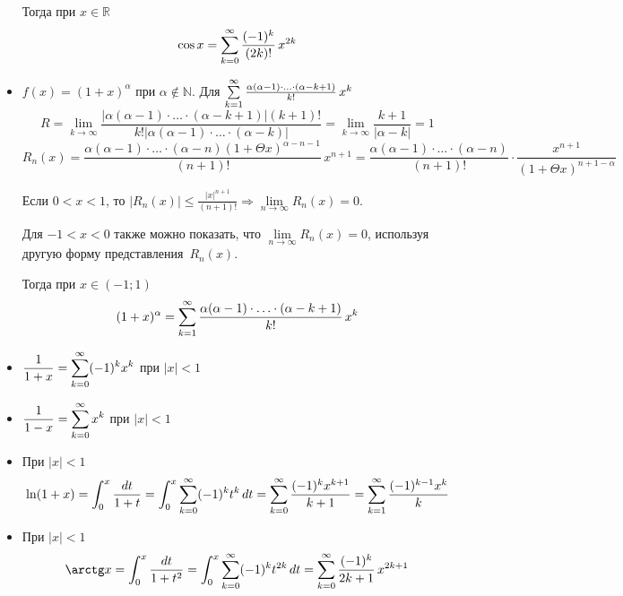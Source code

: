 \begin{itemize}
	Тогда при $x \in \mathbb R$
	\begin{equation*}
	\cos x = \series[0] \frac{(-1)^k}{(2k)!}\,x^{2k}
	\end{equation*}
	
	\item $f(x) = (1 + x)^\alpha$ при $\alpha \notin \mathbb N$.
	Для $\series \frac{\alpha (\alpha - 1) \cdot \ldots \cdot (\alpha - k + 1)}{k!}\,x^k$
	\begin{equation*}
	R = \lim_{k \to \infty} \frac
	{|\alpha (\alpha - 1) \cdot \ldots \cdot (\alpha - k + 1)| (k + 1)!}
	{k! |\alpha (\alpha - 1) \cdot \ldots \cdot (\alpha - k)|} =
	\lim_{k \to \infty} \frac{k + 1}{|\alpha - k|} = 1
	\end{equation*}
	\begin{equation*}
	R_n(x) = \frac{\alpha (\alpha - 1) \cdot \ldots \cdot (\alpha - n) (1 + \Theta x)^{\alpha-n-1}}{(n + 1)!}\,x^{n+1} =
	\frac{\alpha (\alpha - 1) \cdot \ldots \cdot (\alpha - n)}{(n + 1)!} \cdot
	\frac{x^{n+1}}{(1 + \Theta x)^{n+1-\alpha}}
	\end{equation*}
	
	Если $0 < x < 1$, то $|R_n(x)| \leqslant \frac{|x|^{n+1}}{(n + 1)!} \Rightarrow \lim\limits_{n \to \infty} R_n(x) = 0$.
	
	Для $-1 < x < 0$ также можно показать, что $\lim\limits_{n \to \infty} R_n(x) = 0$, используя другую форму представления~$R_n(x)$.
	
	Тогда при $x \in (-1; 1)$
	\begin{equation*}
	(1 + x)^\alpha = \series \frac{\alpha (\alpha - 1) \cdot \ldots \cdot (\alpha - k + 1)}{k!}\,x^k
	\end{equation*}
	
	\item $\displaystyle \frac1{1 + x} = \series[0] (-1)^k x^k$ при $|x| < 1$
	
	\item $\displaystyle \frac1{1 - x} = \series[0] x^k$ при $|x| < 1$
	
	\item При $|x| < 1$
	\begin{equation*}
	\ln (1 + x) =
	\int_0^x \frac{dt}{1 + t} =
	\int_0^x \series[0] (-1)^k t^k\,dt =
	\series[0] \frac{(-1)^k x^{k+1}}{k + 1} =
	\series \frac{(-1)^{k-1} x^k}{k}
	\end{equation*}
	
	\item При $|x| < 1$
	\begin{equation*}
	\arctg x =
	\int_0^x \frac{dt}{1 + t^2} =
	\int_0^x \series[0] (-1)^k t^{2k}\,dt =
	\series[0] \frac{(-1)^k}{2k + 1}\,x^{2k+1}
	\end{equation*}
\end{itemize}

